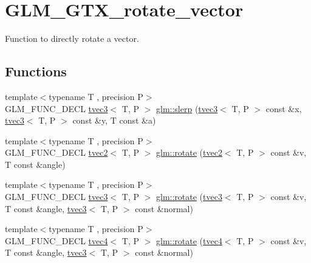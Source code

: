 \hypertarget{group__gtx__rotate__vector}{}\section{G\+L\+M\+\_\+\+G\+T\+X\+\_\+rotate\+\_\+vector}
\label{group__gtx__rotate__vector}


Function to directly rotate a vector.  


\subsection*{Functions}
\begin{DoxyCompactItemize}
\item 
{\footnotesize template$<$typename T , precision P$>$ }\\G\+L\+M\+\_\+\+F\+U\+N\+C\+\_\+\+D\+E\+CL \hyperlink{structglm_1_1tvec3}{tvec3}$<$ T, P $>$ \hyperlink{group__gtx__rotate__vector_gafc9ab3101c3f3799f3d5d6d9d3baac09}{glm\+::slerp} (\hyperlink{structglm_1_1tvec3}{tvec3}$<$ T, P $>$ const \&x, \hyperlink{structglm_1_1tvec3}{tvec3}$<$ T, P $>$ const \&y, T const \&a)
\item 
{\footnotesize template$<$typename T , precision P$>$ }\\G\+L\+M\+\_\+\+F\+U\+N\+C\+\_\+\+D\+E\+CL \hyperlink{structglm_1_1tvec2}{tvec2}$<$ T, P $>$ \hyperlink{group__gtx__rotate__vector_ga9bff444fb191e2e089a906b899cd033d}{glm\+::rotate} (\hyperlink{structglm_1_1tvec2}{tvec2}$<$ T, P $>$ const \&v, T const \&angle)
\item 
{\footnotesize template$<$typename T , precision P$>$ }\\G\+L\+M\+\_\+\+F\+U\+N\+C\+\_\+\+D\+E\+CL \hyperlink{structglm_1_1tvec3}{tvec3}$<$ T, P $>$ \hyperlink{group__gtx__rotate__vector_ga526b6f8995bc0946aa1a04e9297de7c6}{glm\+::rotate} (\hyperlink{structglm_1_1tvec3}{tvec3}$<$ T, P $>$ const \&v, T const \&angle, \hyperlink{structglm_1_1tvec3}{tvec3}$<$ T, P $>$ const \&normal)
\item 
{\footnotesize template$<$typename T , precision P$>$ }\\G\+L\+M\+\_\+\+F\+U\+N\+C\+\_\+\+D\+E\+CL \hyperlink{structglm_1_1tvec4}{tvec4}$<$ T, P $>$ \hyperlink{group__gtx__rotate__vector_gaf4d59dd2f668f9ffb38048055d1316bd}{glm\+::rotate} (\hyperlink{structglm_1_1tvec4}{tvec4}$<$ T, P $>$ const \&v, T const \&angle, \hyperlink{structglm_1_1tvec3}{tvec3}$<$ T, P $>$ const \&normal)
\item 

\end{DoxyCompactItemize}
